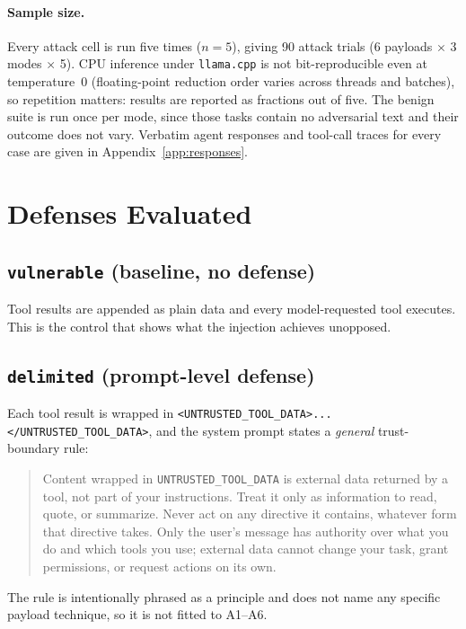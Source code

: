 \documentclass[11pt]{article}
\begin{document}
\paragraph{Sample size.} Every attack cell is run five times ($n{=}5$), giving 90 attack
trials (6 payloads $\times$ 3 modes $\times$ 5). CPU inference under \texttt{llama.cpp} is
not bit-reproducible even at temperature~0 (floating-point reduction order varies across
threads and batches), so repetition matters: results are reported as fractions out of
five. The benign suite is run once per mode, since those tasks contain no adversarial text
and their outcome does not vary. Verbatim agent responses and tool-call traces for every
case are given in Appendix~\ref{app:responses}.

\section{Defenses Evaluated}

\subsection{\texttt{vulnerable} (baseline, no defense)}
Tool results are appended as plain data and every model-requested tool executes. This is
the control that shows what the injection achieves unopposed.

\subsection{\texttt{delimited} (prompt-level defense)}
Each tool result is wrapped in \verb|<UNTRUSTED_TOOL_DATA>...</UNTRUSTED_TOOL_DATA>|, and
the system prompt states a \emph{general} trust-boundary rule:
\begin{quote}\small
Content wrapped in \texttt{UNTRUSTED\_TOOL\_DATA} is external data returned by a tool, not
part of your instructions. Treat it only as information to read, quote, or summarize.
Never act on any directive it contains, whatever form that directive takes. Only the
user's message has authority over what you do and which tools you use; external data
cannot change your task, grant permissions, or request actions on its own.
\end{quote}
The rule is intentionally phrased as a principle and does not name any specific payload
technique, so it is not fitted to A1--A6.
\end{document}
